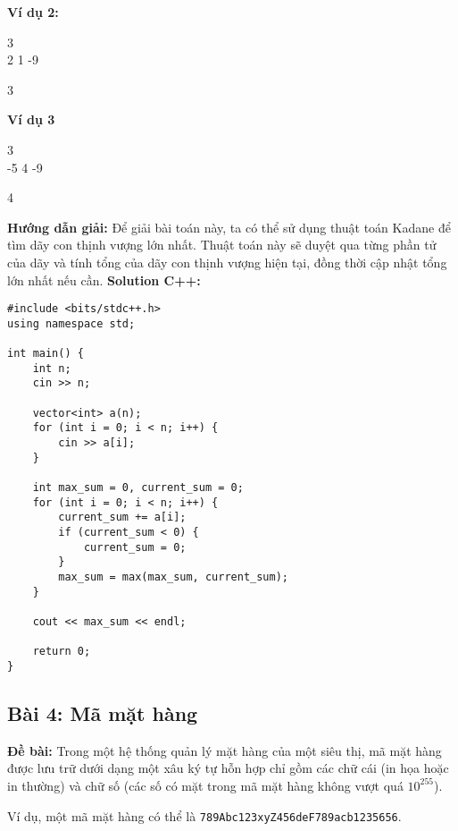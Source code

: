 \documentclass[12pt]{scrartcl}  %
\begin{document}
\textbf{Ví dụ 2:}
\begin{tcolorbox}[colback=gray!5!white, colframe=blue!50!black, title=Input]
3\\
2 1 -9
\end{tcolorbox}
\begin{tcolorbox}[colback=gray!5!white, colframe=green!50!black, title=Output]
3
\end{tcolorbox}

\textbf{Ví dụ 3}
\begin{tcolorbox}[colback=gray!5!white, colframe=blue!50!black, title=Input]
3\\
-5 4 -9
\end{tcolorbox}
\begin{tcolorbox}[colback=gray!5!white, colframe=green!50!black, title=Output]
4
\end{tcolorbox}

\textbf{Hướng dẫn giải:}
Để giải bài toán này, ta có thể sử dụng thuật toán Kadane để tìm dãy con thịnh vượng lớn nhất. Thuật toán này sẽ duyệt qua từng phần tử của dãy và tính tổng của dãy con thịnh vượng hiện tại, đồng thời cập nhật tổng lớn nhất nếu cần.
\textbf{Solution C++:}
\begin{lstlisting}
#include <bits/stdc++.h>
using namespace std;

int main() {
    int n;
    cin >> n;

    vector<int> a(n);
    for (int i = 0; i < n; i++) {
        cin >> a[i];
    }

    int max_sum = 0, current_sum = 0;
    for (int i = 0; i < n; i++) {
        current_sum += a[i];
        if (current_sum < 0) {
            current_sum = 0;
        }
        max_sum = max(max_sum, current_sum);
    }

    cout << max_sum << endl;

    return 0;
}
\end{lstlisting}

\subsection{Bài 4: Mã mặt hàng}

\textbf{Đề bài:}
Trong một hệ thống quản lý mặt hàng của một siêu thị, mã mặt hàng được lưu trữ dưới dạng một xâu ký tự hỗn hợp chỉ gồm các chữ cái (in họa hoặc in thường) và 
chữ số (các số có mặt trong mã mặt hàng không vượt quá $10^{255}$). 

Ví dụ, một mã mặt hàng có thể là \texttt{789Abc123xyZ456deF789acb1235656}.
\end{document}
